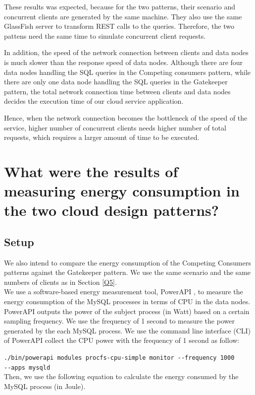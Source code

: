 \documentclass{article}
\begin{document}
These results was expected, because for the two patterns, their scenario and concurrent clients are generated by the same machine. They also use the same GlassFish server to transform REST calls to the queries. Therefore, the two pattens need the same time to simulate concurrent client requests. 

In addition, the speed of the network connection between clients and data nodes is much slower than the response speed of data nodes.
Although there are four data nodes handling the SQL queries in the Competing consumers pattern, while there are only one data node handling the SQL queries in the Gatekeeper pattern, the total network connection time between clients and data nodes decides the execution time of our cloud service application.

Hence, when the network connection becomes the bottleneck of the speed of the service, higher number of concurrent clients needs higher number of total requests, which requires a larger amount of time to be executed.

\section{What were the results of measuring energy consumption in the two cloud design patterns?}\label{Q6}
\subsection{Setup}
We also intend to compare the energy consumption of the Competing Consumers patterns against the Gatekeeper pattern. We use the same scenario and the same numbers of clients as in Section \ref{Q5}.\\

We use a software-based energy measurement tool, PowerAPI \cite{noureddine2012preliminary}, to measure the energy consumption of the MySQL processes in terms of CPU in the data nodes. PowerAPI outputs the power of the subject process (in Watt) based on a certain sampling frequency. We use the frequency of 1 second to measure the power generated by the each MySQL process. We use the command line interface (CLI) of PowerAPI collect the CPU power with the frequency of 1 second as follow:

\texttt{./bin/powerapi modules procfs-cpu-simple monitor -{}-frequency 1000 \\-{}-apps mysqld}\\

Then, we use the following equation to calculate the energy consumed by the MySQL process (in Joule).
\end{document}
